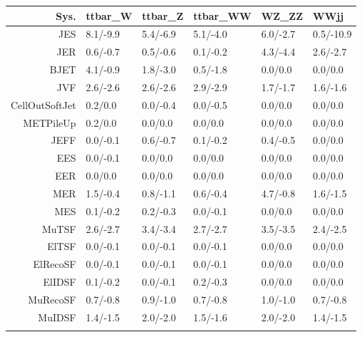 \begin{tabular}{r|p{.08\linewidth}p{.08\linewidth}p{.08\linewidth}p{.08\linewidth}p{.08\linewidth}}
\toprule
 Sys.  & ttbar\_W & ttbar\_Z & ttbar\_WW & WZ\_ZZ & WWjj \\
\toprule
JES  & 8.1/-9.9 & 5.4/-6.9 & 5.1/-4.0 & 6.0/-2.7 & 0.5/-10.9 \\
JER  & 0.6/-0.7 & 0.5/-0.6 & 0.1/-0.2 & 4.3/-4.4 & 2.6/-2.7 \\
BJET  & 4.1/-0.9 & 1.8/-3.0 & 0.5/-1.8 & 0.0/0.0 & 0.0/0.0 \\
JVF  & 2.6/-2.6 & 2.6/-2.6 & 2.9/-2.9 & 1.7/-1.7 & 1.6/-1.6 \\
CellOutSoftJet  & 0.2/0.0 & 0.0/-0.4 & 0.0/-0.5 & 0.0/0.0 & 0.0/0.0 \\
METPileUp  & 0.2/0.0 & 0.0/0.0 & 0.0/0.0 & 0.0/0.0 & 0.0/0.0 \\
JEFF  & 0.0/-0.1 & 0.6/-0.7 & 0.1/-0.2 & 0.4/-0.5 & 0.0/0.0 \\
EES  & 0.0/-0.1 & 0.0/0.0 & 0.0/0.0 & 0.0/0.0 & 0.0/0.0 \\
EER  & 0.0/0.0 & 0.0/0.0 & 0.0/0.0 & 0.0/0.0 & 0.0/0.0 \\
MER  & 1.5/-0.4 & 0.8/-1.1 & 0.6/-0.4 & 4.7/-0.8 & 1.6/-1.5 \\
MES  & 0.1/-0.2 & 0.2/-0.3 & 0.0/-0.1 & 0.0/0.0 & 0.0/0.0 \\
MuTSF  & 2.6/-2.7 & 3.4/-3.4 & 2.7/-2.7 & 3.5/-3.5 & 2.4/-2.5 \\
ElTSF  & 0.0/-0.1 & 0.0/-0.1 & 0.0/-0.1 & 0.0/0.0 & 0.0/0.0 \\
ElRecoSF  & 0.0/-0.1 & 0.0/-0.1 & 0.0/-0.1 & 0.0/0.0 & 0.0/0.0 \\
ElIDSF  & 0.1/-0.2 & 0.0/-0.1 & 0.2/-0.3 & 0.0/0.0 & 0.0/0.0 \\
MuRecoSF  & 0.7/-0.8 & 0.9/-1.0 & 0.7/-0.8 & 1.0/-1.0 & 0.7/-0.8 \\
MuIDSF  & 1.4/-1.5 & 2.0/-2.0 & 1.5/-1.6 & 2.0/-2.0 & 1.4/-1.5 \\
 \\
\bottomrule
\end{tabular}
